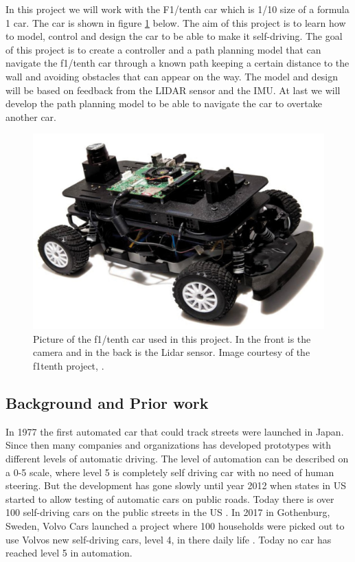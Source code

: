 \documentclass{LTHtwocol} %
\begin{document}
In this project we will work with the F1/tenth car which is 1/10 size of a formula 1 car. The car is shown in figure \ref{fig:f1tenthcar} below. The aim of this project is to learn how to model, control and design the car to be able to make it self-driving. The goal of this project is to create a controller and a path planning model that can navigate the f1/tenth car through a known path keeping a certain distance to the wall and avoiding obstacles that can appear on the way. The model and design will be based on feedback from the LIDAR sensor and the IMU. At last we will develop the path planning model to be able to navigate the car to overtake another car.

\begin{figure}[h]
	\centering
	\includegraphics[width=0.7\columnwidth]{images/f1tenthcar}
	\caption{Picture of the f1/tenth car used in this project. In the front is the camera and in the back is the Lidar sensor. Image courtesy of the f1tenth project, \cite{teensy_schematic}.}
	\label{fig:f1tenthcar}
\end{figure}

\subsection{Background and Prior work} 
In 1977 the first automated car that could track streets were launched in Japan. Since then many companies and organizations has developed prototypes with different levels of automatic driving. The level of automation can be described on a 0-5 scale, where level 5 is completely self driving car with no need of human steering. But the development has gone slowly until year 2012 when states in US started to allow testing of automatic cars on public roads.  Today there is over 100 self-driving cars on the public streets in the US \cite{wikiSelfDrivingCar}. In 2017 in Gothenburg, Sweden, Volvo Cars launched a project where 100 households were picked out to use Volvos new self-driving cars, level 4, in there daily life \cite{volvoCars}. Today no car has reached level 5 in automation.
\end{document}
